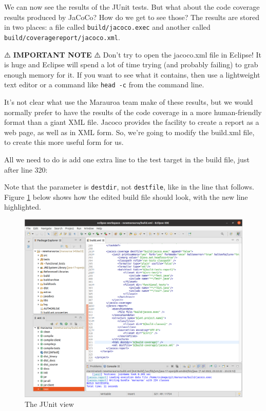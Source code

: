 \documentclass[
]{book}
\newenvironment{Shaded}{\begin{snugshade}}{\end{snugshade}}
\newcommand{\KeywordTok}[1]{\textcolor[rgb]{0.13,0.29,0.53}{\textbf{#1}}}
\newcommand{\OtherTok}[1]{\textcolor[rgb]{0.56,0.35,0.01}{#1}}
\newcommand{\StringTok}[1]{\textcolor[rgb]{0.31,0.60,0.02}{#1}}
\begin{document}
We can now see the results of the JUnit tests. But what about the code coverage results produced by JaCoCo? How do we get to see those? The results are stored in two places: a file called \texttt{build/jacoco.exec} and another called \texttt{build/coveragereport/jacoco.xml}.

⚠️ \textbf{IMPORTANT NOTE} ⚠️
Don't try to open the jacoco.xml file in Eclipse! It is huge and Eclipse will spend a lot of time trying (and probably failing) to grab enough memory for it. If you want to see what it contains, then use a lightweight text editor or a command like \texttt{head\ -c} from the command line.

It's not clear what use the Marauroa team make of these results, but we would normally prefer to have the results of the code coverage in a more human-friendly format than a giant XML file. Jacoco provides the facility to create a report as a web page, as well as in XML form. So, we're going to modify the build.xml file, to create this more useful form for us.

All we need to do is add one extra line to the test target in the build file, just after line 320:

\begin{Shaded}
\end{Shaded}

Note that the parameter is \texttt{destdir}, not \texttt{destfile}, like in the line that follows. Figure \ref{fig:addHTMLreportRequestToBuildFile-fig} below shows how the edited build file should look, with the new line highlighted.

\begin{figure}

{\centering \includegraphics[width=1\linewidth]{images/3.3.5addHTMLreportRequestToBuildFile} 

}

\caption{The JUnit view}\label{fig:addHTMLreportRequestToBuildFile-fig}
\end{figure}
\end{document}
